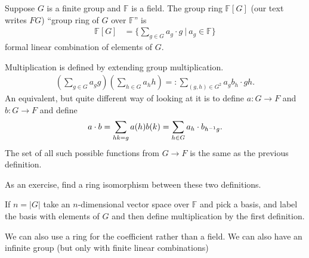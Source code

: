 \documentclass[a4paper]{article}
\begin{document}
\begin{definition}
    Suppose $G$ is a finite group and $\mathbb F$ is a field. The group ring $\mathbb F[G]$ (our text writes $FG$) ``group ring of $G$ over $\mathbb F$'' is \begin{align}
        \mathbb F[G]&=\{\sum_{g\in G}a_g\cdot g~|~a_g\in\mathbb F\}
    \end{align}
    formal linear combination of elements of $G.$

    Multiplication is defined by extending group multiplication. \begin{align}
        \left(\sum_{g\in G}a_gg\right)\left(\sum_{h\in G}a_hh\right)=:\sum_{(g,h)\in G^2}a_gb_h\cdot gh.
    \end{align}
    An equivalent, but quite different way of looking at it is to define $a:G\to F$ and $b:G\to F$ and define \begin{align}
        a\cdot b=\sum_{hk=g}a(h)b(k)=\sum_{h\in G}a_h\cdot b_{h^{-1} g}.
    \end{align}
    The set of all such possible functions from $G\to F$ is the same as the previous definition.

    As an exercise, find a ring isomorphism between these two definitions.
\end{definition}
If $n=|G|$ take an $n$-dimensional vector space over $\mathbb F$ and pick a basis, and label the basis with elements of $G$ and then define multiplication by the first definition.

We can also use a ring for the coefficient rather than a field. We can also have an infinite group (but only with finite linear combinations)
\end{document}
